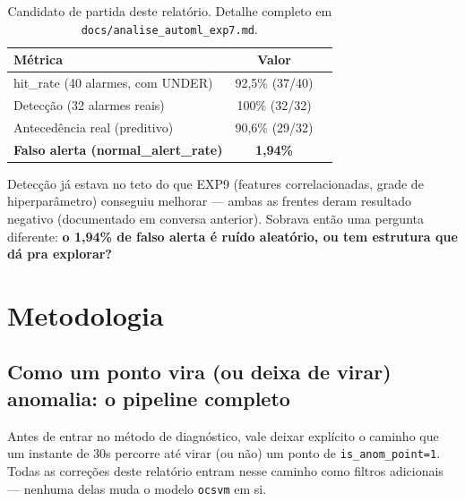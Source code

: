 \documentclass[11pt,a4paper]{article}
\begin{document}
\begin{table}[H]
\centering
\begin{tabular}{@{}lcc@{}}
\toprule
\textbf{Métrica} & \textbf{Valor} \\
\midrule
hit\_rate (40 alarmes, com UNDER) & 92,5\% (37/40) \\
Detecção (32 alarmes reais) & 100\% (32/32) \\
Antecedência real (preditivo) & 90,6\% (29/32) \\
\textbf{Falso alerta (normal\_alert\_rate)} & \textbf{1,94\%} \\
\bottomrule
\end{tabular}
\caption{Candidato de partida deste relatório. Detalhe completo em
\texttt{docs/analise\_automl\_exp7.md}.}
\end{table}

Detecção já estava no teto do que EXP9 (features correlacionadas,
grade de hiperparâmetro) conseguiu melhorar --- ambas as frentes deram
resultado negativo (documentado em conversa anterior). Sobrava então uma
pergunta diferente: \textbf{o 1,94\% de falso alerta é ruído aleatório,
ou tem estrutura que dá pra explorar?}

\section{Metodologia}
\label{sec:metodo}

\subsection{Como um ponto vira (ou deixa de virar) anomalia: o pipeline completo}
\label{sec:pipeline-completo}

Antes de entrar no método de diagnóstico, vale deixar explícito o caminho
que um instante de 30s percorre até virar (ou não) um ponto de
\texttt{is\_anom\_point=1}. Todas as correções deste relatório entram
nesse caminho como filtros adicionais --- nenhuma delas muda o modelo
\texttt{ocsvm} em si.
\end{document}
